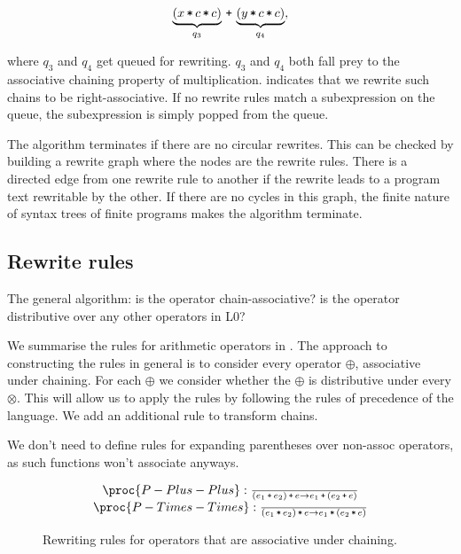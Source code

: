 \[\underbrace{\p{x \lt c \lt c}}_{q_3} \lp \underbrace{\p{y \lt c \lt
c}}_{q_4},\]

where $q_3$ and $q_4$ get queued for rewriting. $q_3$ and $q_4$ both fall prey
to the associative chaining property of multiplication.
 indicates that we rewrite such chains to be
right-associative. If no rewrite rules match a subexpression on the queue, the
subexpression is simply popped from the queue.

The algorithm terminates if there are no circular rewrites. This can be checked
by building a rewrite graph where the nodes are the rewrite rules. There is a
directed edge from one rewrite rule to another if the rewrite leads to a
program text rewritable by the other. If there are no cycles in this graph, the
finite nature of syntax trees of finite programs makes the algorithm terminate.

\subsection{Rewrite rules}

The general algorithm: is the operator chain-associative? is the operator
distributive over any other operators in L0?

We summarise the rules for arithmetic operators in
. The approach to constructing the rules in
general is to consider every operator $\oplus$, associative under chaining. For
each $\oplus$ we consider whether the $\oplus$ is distributive under every
$\otimes$. This will allow us to apply the rules by following the rules of
precedence of the language. We add an additional rule to transform chains.

We don't need to define rules for expanding parentheses over non-assoc
operators, as such functions won't associate anyways.

\begin{figure*}[htbp!]

\[
\begin{matrix}
\proc{P-Plus-Plus}:{\over
\p{e_1 \lp e_2}\lp e \rightarrow e_1 \lp \p{ e_2 \lp e }
}\\
\proc{P-Times-Times}:{\over
\p{e_1\lt e_2}\lt e \rightarrow e_1 \lt \p{ e_2 \lt e }
}\\
\end{matrix}
\]
\caption[]{Rewriting rules for operators that are associative under chaining.}
\label{figure:rewriting-chaining}
\end{figure*}



